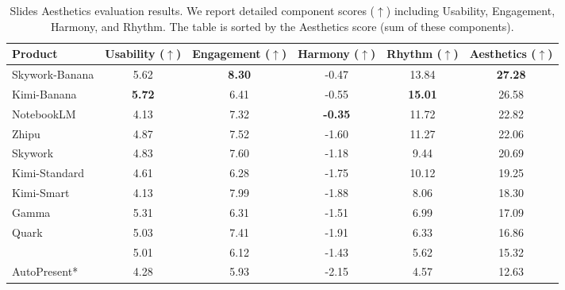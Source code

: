 \begin{table}[htb]
    \small
    \centering
    \setlength{\tabcolsep}{8.0pt} 
    \begin{NiceTabular}{l|cccc:c}
         \toprule
         {\bf Product} & {\bf Usability} ($\uparrow$) & {\bf Engagement} ($\uparrow$) & {\bf Harmony} ($\uparrow$) & {\bf Rhythm} ($\uparrow$) & {\bf Aesthetics} ($\uparrow$) \\
         \midrule
          Skywork-Banana & 5.62 & \textbf{8.30} & -0.47 & 13.84 & \textbf{27.28} \\
          Kimi-Banana & \textbf{5.72} & 6.41 & -0.55 & \textbf{15.01} & 26.58 \\
          NotebookLM & 4.13 & 7.32 & \textbf{-0.35} & 11.72 & 22.82 \\
          Zhipu & 4.87 & 7.52 & -1.60 & 11.27 & 22.06 \\
          Skywork & 4.83 & 7.60 & -1.18 & 9.44 & 20.69 \\
          Kimi-Standard & 4.61 & 6.28 & -1.75 & 10.12 & 19.25 \\
          Kimi-Smart & 4.13 & 7.99 & -1.88 & 8.06 & 18.30 \\
          Gamma & 5.31 & 6.31 & -1.51 & 6.99 & 17.09 \\
          Quark & 5.03 & 7.41 & -1.91 & 6.33 & 16.86 \\
         \hdashline
           & 5.01 & 6.12 & -1.43 & 5.62 & 15.32 \\
          AutoPresent* & 4.28 & 5.93 & -2.15 & 4.57 & 12.63 \\
         \bottomrule
    \end{NiceTabular}
    \caption{Slides Aesthetics evaluation results. We report detailed component scores ($\uparrow$) including Usability, Engagement, Harmony, and Rhythm. The table is sorted by the Aesthetics score (sum of these components). }
    \label{tab:aesthetics_eval}
\end{table}
